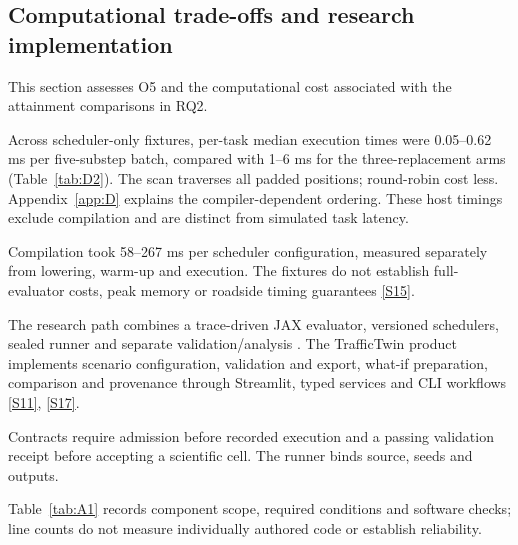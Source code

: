 \documentclass[12pt,a4paper]{article}
\begin{document}
\FloatBarrier
\subsection{Computational trade-offs and research implementation}\label{sec:3.7}

This section assesses O5 and the computational cost associated with the attainment comparisons in RQ2.

Across scheduler-only fixtures, per-task median execution times were 0.05--0.62 ms per five-substep batch, compared with 1--6 ms for the three-replacement arms (Table~\ref{tab:D2}). The scan traverses all padded positions; round-robin cost less. Appendix~\ref{app:D} explains the compiler-dependent ordering. These host timings exclude compilation and are distinct from simulated task latency.





Compilation took 58--267 ms per scheduler configuration, measured separately from lowering, warm-up and execution. The fixtures do not establish full-evaluator costs, peak memory or roadside timing guarantees \hyperref[source-s15]{[S15]}.

The research path combines a trace-driven JAX evaluator, versioned schedulers, sealed runner and separate validation/analysis \cite{ref36}. The TrafficTwin product implements scenario configuration, validation and export, what-if preparation, comparison and provenance through Streamlit, typed services and CLI workflows \hyperref[source-s11]{[S11]}, \hyperref[source-s17]{[S17]}.

Contracts require admission before recorded execution and a passing validation receipt before accepting a scientific cell. The runner binds source, seeds and outputs.

Table~\ref{tab:A1} records component scope, required conditions and software checks; line counts do not measure individually authored code or establish reliability.
\end{document}
